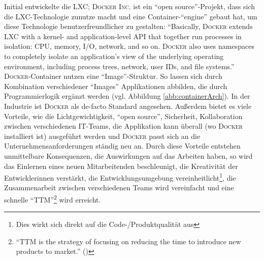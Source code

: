 Initial entwickelte \cite{canonical_ltd_linux_2020} die \ac{LXC}; \textsc{Docker Inc.} ist ein \enquote{open source}-Projekt, dass sich die \ac{LXC}-Technologie zunutze macht und eine Container-\enquote{engine} gebaut hat, um diese Technologie benutzerfreundlicher zu gestalten: \enquote{Basically, \textsc{Docker} extends LXC with a kernel- and application-level API that together run processes in isolation: CPU, memory, I/O, network, and so on. \textsc{Docker} also uses namespaces to completely isolate an application’s view of the underlying operating environment, including process trees, network, user IDs, and file systems.}\autocite[][S.\,82]{bernstein_containers_2014} \textsc{Docker}-Container nutzen eine \enquote{Image}-Struktur. So lassen sich durch Kombination verschiedener \enquote{Images} Applikationen abbilden, die durch Programmierlogik ergänzt werden (vgl. Abbildung \vref{abb:containerArch}). In der Industrie ist \textsc{Docker} als de-facto Standard\autocite[vgl.][S.\,30]{pahl_containerization_2015} angesehen\autocite[vgl.][S.\,1]{kharb_automated_2016}. Außerdem bietet es viele Vorteile, wie die Lichtgewichtigkeit, \enquote{open source}, Sicherheit, Kollaboration zwischen verschiedenen IT-Teams, die Applikation kann überall (wo \textsc{Docker} installiert ist) ausgeführt werden und \textsc{Docker} passt sich an die Unternehmensanforderungen ständig neu an.\autocite[vgl.][S.\,1]{kharb_automated_2016} Durch diese Vorteile entstehen unmittelbare Konsequenzen, die Auswirkungen auf das Arbeiten haben, so wird das Einlernen eines neuen Mitarbeitenden beschleunigt, die Kreativität der Entwicklerinnen verstärkt, die Entwicklungsumgebung vereinheitlicht\footnote{Dies wirkt sich direkt auf die Code-/Produktqualität aus}, die Zusammenarbeit zwischen verschiedenen Teams wird vereinfacht und eine schnelle \enquote{\ac{TTM}}\footnote{\enquote{TTM is the strategy of focusing on reducing the time to introduce new products to market.} (\cite{pawar_time_1994})} wird erreicht.\autocite[vgl.][S.\,2]{kharb_automated_2016} 
\par 
